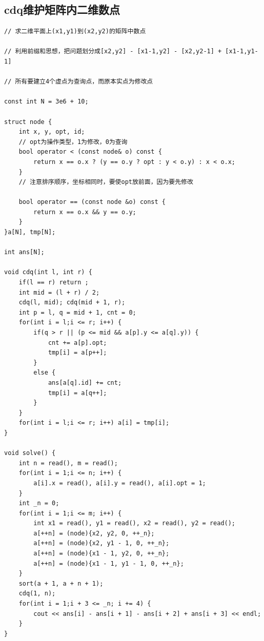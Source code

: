 \documentclass[twoside]{article}
\begin{document}
\subsection{cdq维护矩阵内二维数点}
\begin{lstlisting}
// 求二维平面上(x1,y1)到(x2,y2)的矩阵中数点

// 利用前缀和思想，把问题划分成[x2,y2] - [x1-1,y2] - [x2,y2-1] + [x1-1,y1-1]

// 所有要建立4个虚点为查询点，而原本实点为修改点

const int N = 3e6 + 10;

struct node {
    int x, y, opt, id;
    // opt为操作类型，1为修改，0为查询
    bool operator < (const node& o) const {
        return x == o.x ? (y == o.y ? opt : y < o.y) : x < o.x;
    }
    // 注意排序顺序，坐标相同时，要使opt放前面，因为要先修改

    bool operator == (const node &o) const {
        return x == o.x && y == o.y;
    }
}a[N], tmp[N];

int ans[N];

void cdq(int l, int r) {
    if(l == r) return ;
    int mid = (l + r) / 2;
    cdq(l, mid); cdq(mid + 1, r);
    int p = l, q = mid + 1, cnt = 0;
    for(int i = l;i <= r; i++) {
        if(q > r || (p <= mid && a[p].y <= a[q].y)) {
            cnt += a[p].opt;
            tmp[i] = a[p++];
        }
        else {
            ans[a[q].id] += cnt;
            tmp[i] = a[q++];
        }
    }
    for(int i = l;i <= r; i++) a[i] = tmp[i];
}

void solve() {
    int n = read(), m = read();
    for(int i = 1;i <= n; i++) {
        a[i].x = read(), a[i].y = read(), a[i].opt = 1;
    }
    int _n = 0;
    for(int i = 1;i <= m; i++) {
        int x1 = read(), y1 = read(), x2 = read(), y2 = read();
        a[++n] = (node){x2, y2, 0, ++_n};
        a[++n] = (node){x2, y1 - 1, 0, ++_n};
        a[++n] = (node){x1 - 1, y2, 0, ++_n};
        a[++n] = (node){x1 - 1, y1 - 1, 0, ++_n};
    }
    sort(a + 1, a + n + 1);
    cdq(1, n);
    for(int i = 1;i + 3 <= _n; i += 4) {
        cout << ans[i] - ans[i + 1] - ans[i + 2] + ans[i + 3] << endl;
    }
}
\end{lstlisting}
\end{document}
